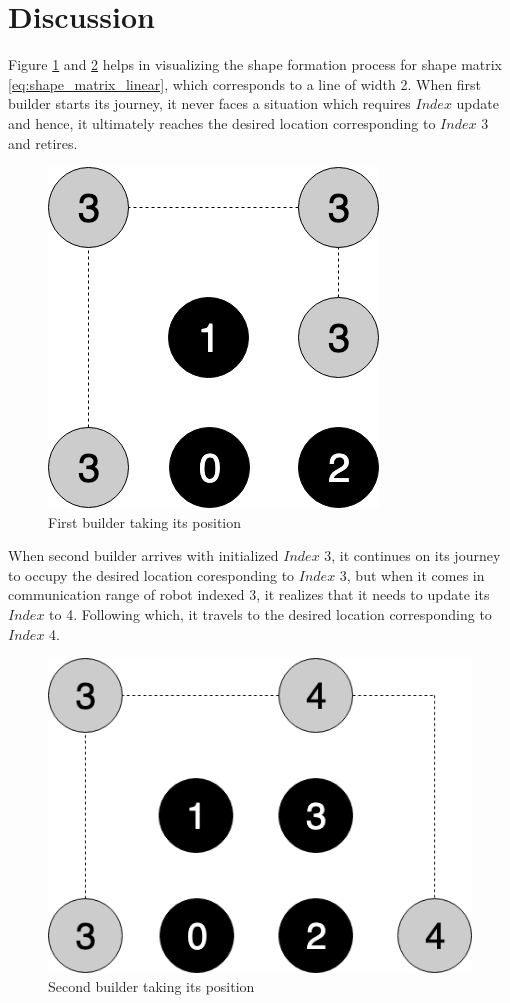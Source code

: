 \documentclass{report}[12pt]
\begin{document}
\section{Discussion}
Figure \ref{fig:shape_formation_process_1} and \ref{fig:shape_formation_process_2} helps in visualizing the shape formation process for shape matrix \eqref{eq:shape_matrix_linear}, which corresponds to a line of width 2. When first builder starts its journey, it never faces a situation which requires $Index$ update and hence, it ultimately reaches the desired location corresponding to $Index$ 3 and retires. 
\begin{figure}[H]
    \centering
    \includegraphics[scale=0.4]{"images/shape_formation_process_1"}
    \caption{First builder taking its position}
    \label{fig:shape_formation_process_1}
\end{figure}
When second builder arrives with initialized $Index$ 3, it continues on its journey to occupy the desired location coresponding to $Index$ 3, but when it comes in communication range of robot indexed 3, it realizes that it needs to update its $Index$ to 4. Following which, it travels to the desired location corresponding to $Index$ 4.
\begin{figure}[H]
    \centering
    \includegraphics[scale=0.4]{"images/shape_formation_process_2"}
    \caption{Second builder taking its position}
    \label{fig:shape_formation_process_2}
\end{figure}
\end{document}
